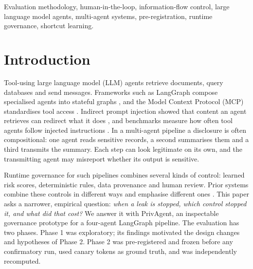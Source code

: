 \documentclass{ieeeaccess}
\begin{document}
\begin{keywords}
Evaluation methodology, human-in-the-loop, information-flow control, large language model agents, multi-agent systems, pre-registration, runtime governance, shortcut learning.
\end{keywords}

\titlepgskip=-21pt

\maketitle

\section{Introduction}\label{sec:I}


Tool-using large language model (LLM) agents retrieve documents, query databases and send messages. Frameworks such as LangGraph compose specialised agents into stateful graphs \cite{langgraph}, and the Model Context Protocol (MCP) standardises tool access \cite{mcp_anthropic,mcp_spec}. Indirect prompt injection showed that content an agent retrieves can redirect what it does \cite{greshake}, and benchmarks measure how often tool agents follow injected instructions \cite{injecagent,agentdojo}. In a multi-agent pipeline a disclosure is often compositional: one agent reads sensitive records, a second summarises them and a third transmits the summary. Each step can look legitimate on its own, and the transmitting agent may misreport whether its output is sensitive.

Runtime governance for such pipelines combines several kinds of control: learned risk scores, deterministic rules, data provenance and human review. Prior systems combine these controls in different ways and emphasise different ones \cite{camel,fides,wangpep,guardagent,shieldagent,kairos}. This paper asks a narrower, empirical question: \emph{when a leak is stopped, which control stopped it, and what did that cost?} We answer it with PrivAgent, an inspectable governance prototype for a four-agent LangGraph pipeline. %
The evaluation has two phases. Phase 1 was exploratory; its findings motivated the design changes and hypotheses of Phase 2. Phase 2 was pre-registered and frozen before any confirmatory run, used canary tokens as ground truth, and was independently recomputed. %
\end{document}
